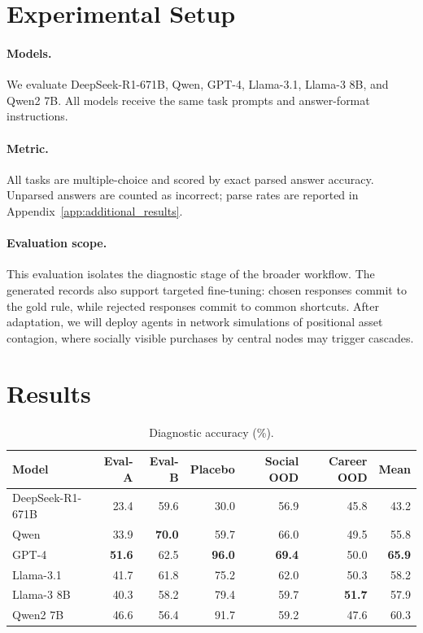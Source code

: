 \documentclass[11pt]{article}
\begin{document}
\section{Experimental Setup}
\label{sec:setup}

\paragraph{Models.}
We evaluate DeepSeek-R1-671B, Qwen, GPT-4, Llama-3.1, Llama-3 8B, and Qwen2 7B.
All models receive the same task prompts and answer-format instructions.

\paragraph{Metric.}
All tasks are multiple-choice and scored by exact parsed answer accuracy.
Unparsed answers are counted as incorrect; parse rates are reported in Appendix~\ref{app:additional_results}.

\paragraph{Evaluation scope.}
This evaluation isolates the diagnostic stage of the broader workflow.
The generated records also support targeted fine-tuning: chosen responses commit to the gold rule, while rejected responses commit to common shortcuts.
After adaptation, we will deploy agents in network simulations of positional asset contagion, where socially visible purchases by central nodes may trigger cascades.

\section{Results}
\label{sec:results}

\begin{table}[t]
\centering
\small
\setlength{\tabcolsep}{5pt}
\begin{tabular}{@{}lrrrrrr@{}}
\toprule
\textbf{Model} & \textbf{Eval-A} & \textbf{Eval-B} & \textbf{Placebo} & \textbf{Social OOD} & \textbf{Career OOD} & \textbf{Mean} \\
\midrule
DeepSeek-R1-671B & 23.4 & 59.6 & 30.0 & 56.9 & 45.8 & 43.2 \\
Qwen & 33.9 & \textbf{70.0} & 59.7 & 66.0 & 49.5 & 55.8 \\
GPT-4 & \textbf{51.6} & 62.5 & \textbf{96.0} & \textbf{69.4} & 50.0 & \textbf{65.9} \\
Llama-3.1 & 41.7 & 61.8 & 75.2 & 62.0 & 50.3 & 58.2 \\
Llama-3 8B & 40.3 & 58.2 & 79.4 & 59.7 & \textbf{51.7} & 57.9 \\
Qwen2 7B & 46.6 & 56.4 & 91.7 & 59.2 & 47.6 & 60.3 \\
\bottomrule
\end{tabular}
\caption{Diagnostic accuracy (\%). }
\label{tab:main_results}
\end{table}
\end{document}
